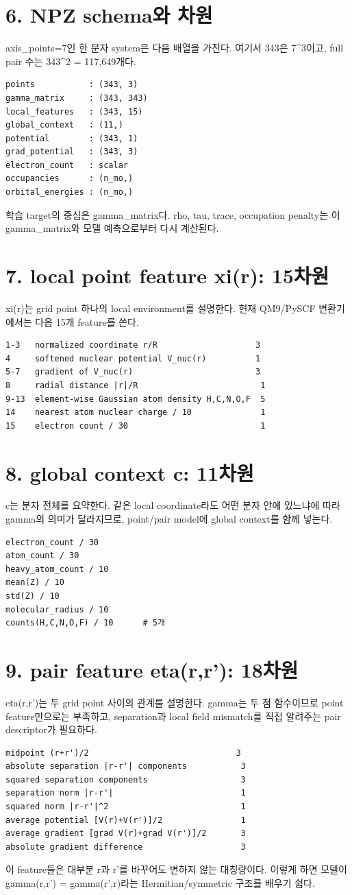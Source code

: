 \documentclass[11pt]{article}
\begin{document}
\section*{6. NPZ schema와 차원}
axis\_points=7인 한 분자 system은 다음 배열을 가진다. 여기서 343은 7^3이고, full pair 수는 343^2 = 117,649개다.
\begin{lstlisting}
points           : (343, 3)
gamma_matrix     : (343, 343)
local_features   : (343, 15)
global_context   : (11,)
potential        : (343, 1)
grad_potential   : (343, 3)
electron_count   : scalar
occupancies      : (n_mo,)
orbital_energies : (n_mo,)
\end{lstlisting}
학습 target의 중심은 gamma\_matrix다. rho, tau, trace, occupation penalty는 이 gamma\_matrix와 모델 예측으로부터 다시 계산된다.
\section*{7. local point feature xi(r): 15차원}
xi(r)는 grid point 하나의 local environment를 설명한다. 현재 QM9/PySCF 변환기에서는 다음 15개 feature를 쓴다.
\begin{lstlisting}
1-3   normalized coordinate r/R                    3
4     softened nuclear potential V_nuc(r)          1
5-7   gradient of V_nuc(r)                         3
8     radial distance |r|/R                         1
9-13  element-wise Gaussian atom density H,C,N,O,F  5
14    nearest atom nuclear charge / 10              1
15    electron count / 30                           1
\end{lstlisting}
\section*{8. global context c: 11차원}
c는 분자 전체를 요약한다. 같은 local coordinate라도 어떤 분자 안에 있느냐에 따라 gamma의 의미가 달라지므로, point/pair model에 global context를 함께 넣는다.
\begin{lstlisting}
electron_count / 30
atom_count / 30
heavy_atom_count / 10
mean(Z) / 10
std(Z) / 10
molecular_radius / 10
counts(H,C,N,O,F) / 10      # 5개
\end{lstlisting}
\section*{9. pair feature eta(r,r'): 18차원}
eta(r,r')는 두 grid point 사이의 관계를 설명한다. gamma는 두 점 함수이므로 point feature만으로는 부족하고, separation과 local field mismatch를 직접 알려주는 pair descriptor가 필요하다.
\begin{lstlisting}
midpoint (r+r')/2                              3
absolute separation |r-r'| components           3
squared separation components                   3
separation norm |r-r'|                          1
squared norm |r-r'|^2                           1
average potential [V(r)+V(r')]/2                1
average gradient [grad V(r)+grad V(r')]/2       3
absolute gradient difference                    3
\end{lstlisting}
이 feature들은 대부분 r과 r'를 바꾸어도 변하지 않는 대칭량이다. 이렇게 하면 모델이 gamma(r,r') = gamma(r',r)라는 Hermitian/symmetric 구조를 배우기 쉽다.
\end{document}

